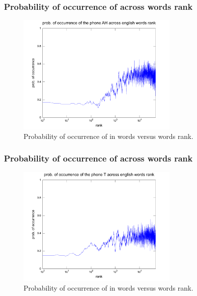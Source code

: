 \documentclass{beamer}
\begin{document}
\frame
{
  \frametitle{Probability of occurrence of \textipa{[@]} across words rank}
\begin{figure}[h!]
\centering
\includegraphics[width=0.7\textwidth]{images/proboccwordsphone_AH.pdf}
\caption{Probability of occurrence of \textipa{[@]} in words versus words rank.}
\label{fig:proboccwordsphone_AH}
\end{figure} 
}


\frame
{
  \frametitle{Probability of occurrence of \textipa{[t]} across words rank}
\begin{figure}[h!]
\centering
\includegraphics[width=0.7\textwidth]{images/proboccwordsphone_T.pdf}
\caption{Probability of occurrence of \textipa{[t]} in words versus words rank.}
\label{fig:proboccwordsphone_T}
\end{figure} 
}
\end{document}
